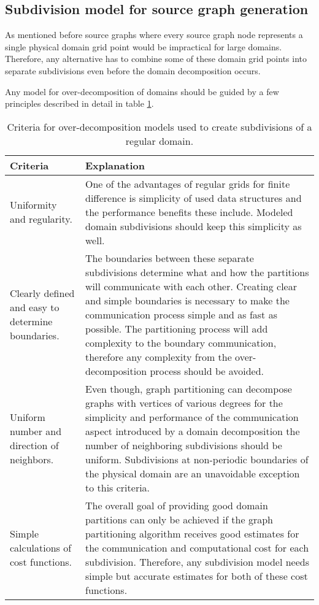 \subsection{Subdivision model for source graph generation}
\label{sec:subdivmodel}
As mentioned before source graphs where every source graph node represents a single physical domain grid point would be impractical for large domains.
Therefore, any alternative has to combine some of these domain grid points into separate subdivisions even before the domain decomposition occurs.

Any model for over-decomposition of domains should be guided by a few principles described in detail in table \ref{tab:criteria}.

\begin{table}[!htbp]
\centering
{}
\begin{tabular}{p{4.5cm} p{9.5cm}}
\toprule
Criteria & Explanation \\
\midrule
Uniformity and regularity.
&
One of the advantages of regular grids for finite difference is simplicity of used data structures and the performance benefits these include.
Modeled domain subdivisions should keep this simplicity as well.
\\
Clearly defined and easy to determine boundaries. 
&
The boundaries between these separate subdivisions determine what and how the partitions will communicate with each other.
Creating clear and simple boundaries is necessary to make the communication process simple and as fast as possible.
The partitioning process will add complexity to the boundary communication, therefore any complexity from the over-decomposition process should be avoided.
\\
Uniform number and direction of neighbors.
&
Even though, graph partitioning can decompose graphs with vertices of various degrees for the simplicity and performance of the communication aspect introduced by a domain decomposition the number of neighboring subdivisions should be uniform. Subdivisions at non-periodic boundaries of the physical domain are an unavoidable exception to this criteria.
\\
Simple calculations of cost functions.
&
The overall goal of providing good domain partitions can only be achieved if the graph partitioning algorithm receives good estimates for the communication and computational cost for each subdivision.
Therefore, any subdivision model needs simple but accurate estimates for both of these cost functions.
\\
\bottomrule
\end{tabular}
\caption{Criteria for over-decomposition models used to create subdivisions of a regular domain.}
\label{tab:criteria}
\end{table}

